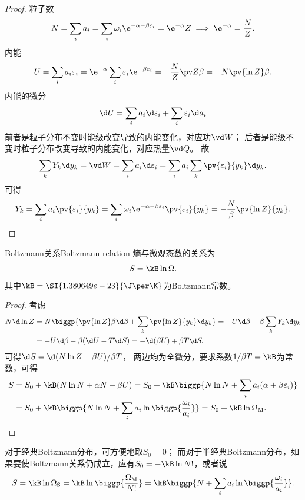 \begin{proof}
	粒子数
	\[
		N=\sum_i a_i=\sum_i \omega_i\e^{-\alpha-\beta\varepsilon_i}=\e^{-\alpha}Z
		\implies\e^{-\alpha}=\frac NZ.
	\]
	内能
	\[
		U=\sum_i a_i\varepsilon_i=\e^{-\alpha}\sum_i \varepsilon_i\e^{-\beta\varepsilon_i}=-\frac NZ\pv Z\beta=-N\pv{\ln Z}\beta.
	\]
	内能的微分
	\[
		\d U=\sum_i a_i\d\varepsilon_i+\sum_i \varepsilon_i\d a_i
	\]
	前者是粒子分布不变时能级改变导致的内能变化，对应功$\vd W$；
	后者是能级不变时粒子分布改变导致的内能变化，对应热量$\vd Q$。
	故
	\[
		\sum_k Y_k\d y_k=\vd W=\sum_i a_i\d\varepsilon_i=\sum_i a_i\sum_k\pv{\varepsilon_i}{y_k}\d y_k.
	\]
	可得
	\[
		Y_k=\sum_i a_i\pv{\varepsilon_i}{y_k}=\sum_i \omega_i\e^{-\alpha-\beta\varepsilon_i}\pv{\varepsilon_i}{y_k}=-\frac N\beta\pv{\ln Z}{y_k}.
		\qedhere
	\]
\end{proof}

\begin{theorem}{Boltzmann关系}{Boltzmann relation}
	熵与微观态数的关系为
	\begin{equation}
		S=\kB\ln\Omega.
	\end{equation}
	其中$\kB=\SI{1.380649e-23}{\J\per\K}$为Boltzmann常数。
\end{theorem}

\begin{proof}
	考虑
	\begin{align*}
		N\d\ln Z&=N\biggp{\pv{\ln Z}\beta\d\beta+\sum_k\pv{\ln Z}{y_k}\d y_k}=-U\d\beta-\beta\sum_k Y_k\d y_k\\
		&=-U\d\beta-\beta(\d U-T\d S)=-\d(\beta U)+\beta T\d S.
	\end{align*}
	可得$\d S=\d(N\ln Z+\beta U)/\beta T$，
	两边均为全微分，要求系数$1/\beta T=\kB$为常数，可得
	\begin{align*}
		S&=S_0+\kB(N\ln N+\alpha N+\beta U)
		=S_0+\kB\biggp{N\ln N+\sum_i a_i(\alpha+\beta\varepsilon_i)}\\
		&=S_0+\kB\biggp{N\ln N+\sum_i a_i\ln\biggp{\frac{\omega_i}{a_i}}}
		=S_0+\kB\ln\Om[M].
		\qedhere
	\end{align*}
\end{proof}

\begin{remark}
	对于经典Boltzmann分布，可方便地取$S_0=0$；
	而对于半经典Boltzmann分布，如果要使Boltzmann关系仍成立，应有$S_0=-\kB\ln N!$，或者说 
	\[
		S=\kB\ln\Om[S]=\kB\ln\biggp{\frac{\Om[M]}{N!}}
		=\kB\biggp{N+\sum_i a_i\ln\biggp{\frac{\omega_i}{a_i}}}.
	\]
\end{remark}

